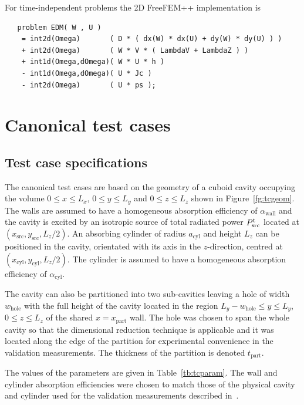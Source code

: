 \documentclass[a4paper]{article}
\numberwithin{equation}{section}
\newcounter{Table}
\newcounter{Figure}
\begin{document}
For time-independent problems the 2D FreeFEM++ implementation is 
\begin{verbatim}
   problem EDM( W , U ) 
    = int2d(Omega)       ( D * ( dx(W) * dx(U) + dy(W) * dy(U) ) )
    + int2d(Omega)       ( W * V * ( LambdaV + LambdaZ ) )
    + int1d(Omega,dOmega)( W * U * h )   
    - int1d(Omega,dOmega)( U * Jc )
    - int2d(Omega)       ( U * ps );
\end{verbatim}

\section[Canonical test cases]{Canonical test cases}
\label{sc:tcs}

\subsection[Test case specifications]{Test case specifications}
\label{sc:tcs:spec}

The canonical test cases are based on the geometry of a
cuboid cavity occupying the volume $0 \leq x \leq L_x$, $0 \leq y \leq L_y$ and 
$0 \leq z \leq L_z$ shown in Figure~\ref{fg:tcgeom}. The walls are assumed to have 
a homogeneous absorption efficiency of $\alpha_\mathrm{wall}$ and the cavity is excited
by an isotropic source of total radiated power $P^{\mathrm{t}}_\mathrm{src}$ located at 
$(x_\mathrm{src},y_\mathrm{src},L_z/2)$. An absorbing cylinder of radius $a_\mathrm{cyl}$ 
and height $L_z$ can be positioned in the cavity, orientated with its axis in the
$z$-direction, centred at $(x_\mathrm{cyl},y_\mathrm{cyl},L_z/2)$. The cylinder is assumed
to have a homogeneous absorption efficiency of $\alpha_\mathrm{cyl}$.

The cavity can also be partitioned into two sub-cavities leaving a hole of width
$w_\mathrm{hole}$ with the full height of the cavity located in the region 
$L_y-w_\mathrm{hole} \leq y \leq L_y$, $0 \leq z \leq L_z$ of the shared 
$x=x_\mathrm{part}$ wall. The hole was chosen to span the whole cavity so that the 
dimensional reduction technique is applicable and it was located along the edge of the 
partition for experimental convenience in the validation measurements.
The thickness of the partition is denoted $t_\mathrm{part}$.

The values of the parameters are given in Table~\ref{tb:tcparam}. The wall and cylinder
absorption efficiencies were chosen to match those of the physical cavity and
cylinder used for the validation measurements described in~\citep{Flintoft2017b}.
\end{document}
